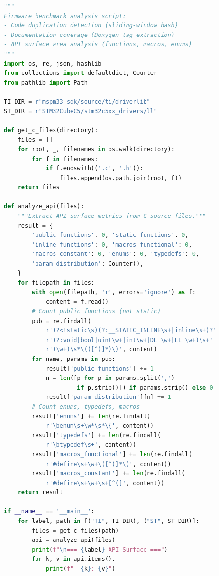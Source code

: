 \begin{lstlisting}[language=Python, caption={Abbreviated \texttt{analyze\_firmware.py} --- API and documentation extraction.}, label={lst:analyze-firmware}]
"""
Firmware benchmark analysis script:
- Code duplication detection (sliding-window hash)
- Documentation coverage (Doxygen tag extraction)
- API surface area analysis (functions, macros, enums)
"""
import os, re, json, hashlib
from collections import defaultdict, Counter
from pathlib import Path

TI_DIR = r"mspm33_sdk/source/ti/driverlib"
ST_DIR = r"STM32CubeC5/stm32c5xx_drivers/ll"

def get_c_files(directory):
    files = []
    for root, _, filenames in os.walk(directory):
        for f in filenames:
            if f.endswith(('.c', '.h')):
                files.append(os.path.join(root, f))
    return files

def analyze_api(files):
    """Extract API surface metrics from C source files."""
    result = {
        'public_functions': 0, 'static_functions': 0,
        'inline_functions': 0, 'macros_functional': 0,
        'macros_constant': 0, 'enums': 0, 'typedefs': 0,
        'param_distribution': Counter(),
    }
    for filepath in files:
        with open(filepath, 'r', errors='ignore') as f:
            content = f.read()
        # Count public functions (not static)
        pub = re.findall(
            r'(?<!static\s)(?:__STATIC_INLINE\s+|inline\s+)?'
            r'(?:void|bool|uint\w+|int\w+|DL_\w+|LL_\w+)\s+'
            r'(\w+)\s*\(([^)]*)\)', content)
        for name, params in pub:
            result['public_functions'] += 1
            n = len([p for p in params.split(',')
                     if p.strip()]) if params.strip() else 0
            result['param_distribution'][n] += 1
        # Count enums, typedefs, macros
        result['enums'] += len(re.findall(
            r'\benum\s+\w*\s*\{', content))
        result['typedefs'] += len(re.findall(
            r'\btypedef\s+', content))
        result['macros_functional'] += len(re.findall(
            r'#define\s+\w+\([^)]*\)', content))
        result['macros_constant'] += len(re.findall(
            r'#define\s+\w+\s+[^(]', content))
    return result

if __name__ == '__main__':
    for label, path in [("TI", TI_DIR), ("ST", ST_DIR)]:
        files = get_c_files(path)
        api = analyze_api(files)
        print(f"\n=== {label} API Surface ===")
        for k, v in api.items():
            print(f"  {k}: {v}")
\end{lstlisting}
